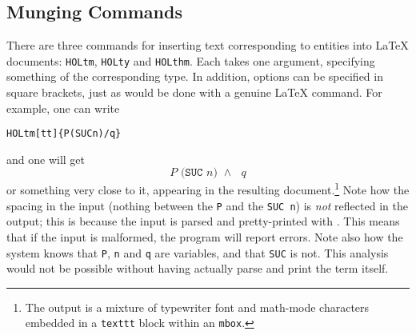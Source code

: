 \subsection{Munging Commands}
\label{sec:munging-commands}
\newcommand{\holtm}{\texttt{\bs{}HOLtm}}
\newcommand{\holty}{\texttt{\bs{}HOLty}}
\newcommand{\holthm}{\texttt{\bs{}HOLthm}}
There are three commands for inserting text corresponding to \HOL{} entities into \LaTeX{} documents: \holtm, \holty{} and \holthm.
%
Each takes one argument, specifying something of the corresponding \HOL{} type.
%
In addition, options can be specified in square brackets, just as would be done with a genuine \LaTeX{} command.
%
For example, one can write
\begin{alltt}
   \holtm{}[tt]\{P(SUC n) /\bs{} q\}
\end{alltt}
and one will get \[
  \texttt{$P$ (SUC $n$) $\land$ $q$}
\]
or something very close to it, appearing in the resulting document.\footnote{The output is a mixture of typewriter font and math-mode characters embedded in a \texttt{\bs{}texttt} block within an \texttt{\bs{}mbox}.}
%
Note how the spacing in the input (nothing between the \texttt{P} and the \texttt{SUC n}) is \emph{not} reflected in the output; this is because the input is parsed and pretty-printed with \HOL{}.
%
This means that if the \HOL{} input is malformed, the \munge{} program will report errors.
%
Note also how the system knows that \texttt{P}, \texttt{n} and \texttt{q} are variables, and that \texttt{SUC} is not.
%
This analysis would not be possible without having \HOL{} actually parse and print the term itself.

